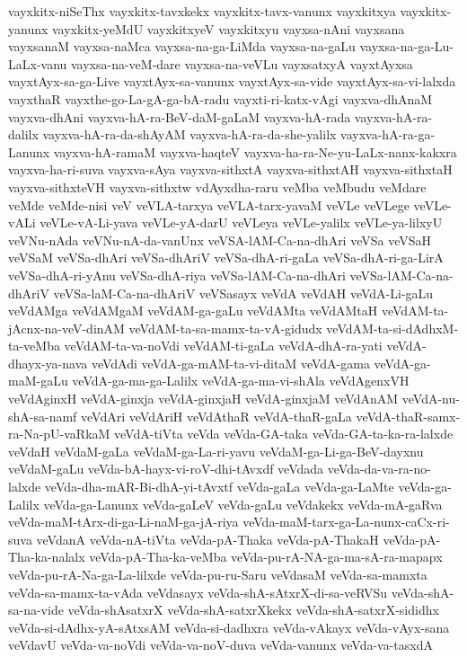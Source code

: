 {vayxkitx-niSeThx
vayxkitx-tavxkekx
vayxkitx-tavx-vanunx
vayxkitxya
vayxkitx-yanunx
vayxkitx-yeMdU
vayxkitxyeV
vayxkitxyu
vayxsa-nAni
vayxsana
vayxsanaM
vayxsa-naMca
vayxsa-na-ga-LiMda
vayxsa-na-gaLu
vayxsa-na-ga-Lu-LaLx-vanu
vayxsa-na-veM-dare
vayxsa-na-veVLu
vayxsatxyA
vayxtAyxsa
vayxtAyx-sa-ga-Live
vayxtAyx-sa-vanunx
vayxtAyx-sa-vide
vayxtAyx-sa-vi-lalxda
vayxthaR
vayxthe-go-La-gA-ga-bA-radu
vayxti-ri-katx-vAgi
vayxva-dhAnaM
vayxva-dhAni
vayxva-hA-ra-BeV-daM-gaLaM
vayxva-hA-rada
vayxva-hA-ra-dalilx
vayxva-hA-ra-da-shAyAM
vayxva-hA-ra-da-she-yalilx
vayxva-hA-ra-ga-Lanunx
vayxva-hA-ramaM
vayxva-haqteV
vayxva-ha-ra-Ne-yu-LaLx-nanx-kakxra
vayxva-ha-ri-suva
vayxva-sAya
vayxva-sithxtA
vayxva-sithxtAH
vayxva-sithxtaH
vayxva-sithxteVH
vayxva-sithxtw
vdAyxdha-raru
veMba
veMbudu
veMdare
veMde
veMde-nisi
veV
veVLA-tarxya
veVLA-tarx-yavaM
veVLe
veVLege
veVLe-vALi
veVLe-vA-Li-yava
veVLe-yA-darU
veVLeya
veVLe-yalilx
veVLe-ya-lilxyU
veVNu-nAda
veVNu-nA-da-vanUnx
veVSA-lAM-Ca-na-dhAri
veVSa
veVSaH
veVSaM
veVSa-dhAri
veVSa-dhAriV
veVSa-dhA-ri-gaLa
veVSa-dhA-ri-ga-LirA
veVSa-dhA-ri-yAnu
veVSa-dhA-riya
veVSa-lAM-Ca-na-dhAri
veVSa-lAM-Ca-na-dhAriV
veVSa-laM-Ca-na-dhAriV
veVSasayx
veVdA
veVdAH
veVdA-Li-gaLu
veVdAMga
veVdAMgaM
veVdAM-ga-gaLu
veVdAMta
veVdAMtaH
veVdAM-ta-jAcnx-na-veV-dinAM
veVdAM-ta-sa-mamx-ta-vA-gidudx
veVdAM-ta-si-dAdhxM-ta-veMba
veVdAM-ta-va-noVdi
veVdAM-ti-gaLa
veVdA-dhA-ra-yati
veVdA-dhayx-ya-nava
veVdAdi
veVdA-ga-mAM-ta-vi-ditaM
veVdA-gama
veVdA-ga-maM-gaLu
veVdA-ga-ma-ga-Lalilx
veVdA-ga-ma-vi-shAla
veVdAgenxVH
veVdAginxH
veVdA-ginxja
veVdA-ginxjaH
veVdA-ginxjaM
veVdAnAM
veVdA-nu-shA-sa-namf
veVdAri
veVdAriH
veVdAthaR
veVdA-thaR-gaLa
veVdA-thaR-samx-ra-Na-pU-vaRkaM
veVdA-tiVta
veVda
veVda-GA-taka
veVda-GA-ta-ka-ra-lalxde
veVdaH
veVdaM-gaLa
veVdaM-ga-La-ri-yavu
veVdaM-ga-Li-ga-BeV-dayxnu
veVdaM-gaLu
veVda-bA-hayx-vi-roV-dhi-tAvxdf
veVdada
veVda-da-va-ra-no-lalxde
veVda-dha-mAR-Bi-dhA-yi-tAvxtf
veVda-gaLa
veVda-ga-LaMte
veVda-ga-Lalilx
veVda-ga-Lanunx
veVda-gaLeV
veVda-gaLu
veVdakekx
veVda-mA-gaRva
veVda-maM-tArx-di-ga-Li-naM-ga-jA-riya
veVda-maM-tarx-ga-La-nunx-caCx-ri-suva
veVdanA
veVda-nA-tiVta
veVda-pA-Thaka
veVda-pA-ThakaH
veVda-pA-Tha-ka-nalalx
veVda-pA-Tha-ka-veMba
veVda-pu-rA-NA-ga-ma-sA-ra-mapapx
veVda-pu-rA-Na-ga-La-lilxde
veVda-pu-ru-Saru
veVdasaM
veVda-sa-mamxta
veVda-sa-mamx-ta-vAda
veVdasayx
veVda-shA-sAtxrX-di-sa-veRVSu
veVda-shA-sa-na-vide
veVda-shAsatxrX
veVda-shA-satxrXkekx
veVda-shA-satxrX-sididhx
veVda-si-dAdhx-yA-sAtxsAM
veVda-si-dadhxra
veVda-vAkayx
veVda-vAyx-sana
veVdavU
veVda-va-noVdi
veVda-va-noV-duva
veVda-vanunx
veVda-va-tasxdA
}
